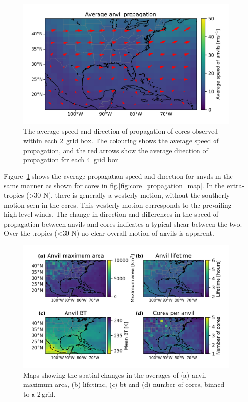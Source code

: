\begin{figure}[tp]
    \centering
    \includegraphics[width=\textwidth]{figures/chapter2_18.png}
    \caption[
    The average speed and direction of propagation of anvils
    ]{
    The average speed and direction of propagation of cores observed within each 2\textdegree\ grid box. The colouring shows the average speed of propagation, and the red arrows show the average direction of propagation for each 4\textdegree\ grid box
    }
    \label{fig:anvil_propagation_map}
\end{figure}

Figure~\ref{fig:anvil_propagation_map} shows the average propagation speed and direction for anvils in the same manner as shown for cores in fig.\ref{fig:core_propagation_map}.
In the extra-tropics (\textgreater30\,\textdegree\,N), there is generally a westerly motion, without the southerly motion seen in the cores.
This westerly motion corresponds to the prevailing high-level winds.
The change in direction and differences in the speed of propagation between anvils and cores indicates a typical shear between the two.
Over the tropics (\textless30\,\textdegree\,N) no clear overall motion of anvils is apparent.


\begin{figure}[tp]
    \centering
    \includegraphics[width=\textwidth]{figures/chapter2_19.png}
    \caption[
    Maps showing the spatial changes in the averages of anvil maximum area, lifetime, \acrshort{bt} and number of cores
    ]{
    Maps showing the spatial changes in the averages of (a) anvil maximum area, (b) lifetime, (c) \acrshort{bt} and (d) number of cores, binned to a 2\,\textdegree grid.
    }
    \label{fig:anvil_properties_maps}
\end{figure}


